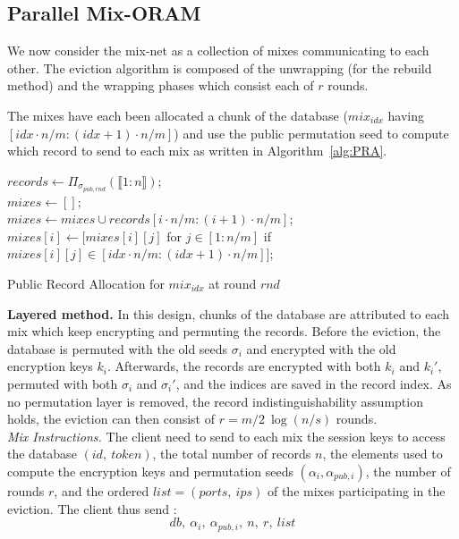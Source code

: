 \documentclass[USenglish,oneside,twocolumn]{article}
\begin{document}
\subsection{Parallel Mix-ORAM}\label{parallelMixORAM}
%
We now consider the mix-net as a collection of mixes communicating to each other. The eviction algorithm is composed of the unwrapping (for the rebuild method) and the wrapping phases which consist each of $r$ rounds.

The mixes have each been allocated a chunk of the database ($mix_{idx}$ having $[idx\cdot n/m : (idx+1)\cdot n/m]$) and use the public permutation seed to compute which record to send to each mix as written in Algorithm~\ref{alg:PRA}.


\begin{algorithm}
\DontPrintSemicolon
{}
$records \gets {\Pi}_{\sigma_{pub, rnd}}(\llbracket 1 : n \rrbracket)$;\\
$mixes \gets []$;\\
{
	$mixes \gets mixes \cup records[i\cdot n/m : (i+1)\cdot n/m]$;\\
	$mixes[i]\gets [mixes[i][j]$ for $j \in [1:n/m]$ if $mixes[i][j] \in [idx\cdot n/m : (idx+1)\cdot n/m] ]$;\\
}
\caption{Public Record Allocation for $mix_{idx}$ at round $rnd$}
\label{alg:PRA}
\end{algorithm}

\noindent\textbf{Layered method.} In this design, chunks of the database are attributed to each mix which keep encrypting and permuting the records. Before the eviction, the database is permuted with the old seeds $\sigma_i$ and encrypted with the old encryption keys $k_i$. Afterwards, the records are encrypted with both $k_i$ and $k_i'$, permuted with both $\sigma_i$ and $\sigma_i'$, and the indices are saved in the record index. 
As no permutation layer is removed, the record indistinguishability assumption holds, the eviction can then consist of $r= m/2 \ \log(n/s)$ rounds. \\

\noindent\textit{Mix Instructions.}
The client need to send to each mix the session keys to access the database $(id,\ token)$, the total number of records $n$, the elements used to compute the encryption keys and permutation seeds $(\alpha_i, \alpha_{pub, i})$, the number of rounds $r$, and the ordered $list=(ports,\ ips)$ of the mixes participating in the eviction. The client thus send :
$$db,\ \alpha_i,\ \alpha_{pub, i},\ n,\ r,\ list$$
\end{document}
